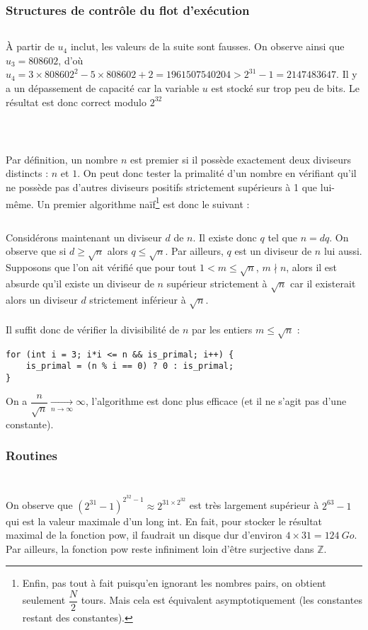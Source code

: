 \documentclass[../main.tex]{subfiles}
\begin{document}
\subsubsection{Structures de contrôle du flot d'exécution}
\solution{[COURS]}
\inputminted{c}{solutions/cours_structure_controle.c}
À partir de $u_{4}$ inclut, les valeurs de la suite sont fausses. On observe ainsi que $u_{3} = 808602$, d'où $u_{4} = 3\times808602^{2} - 5\times{808602} + 2 = 1961507540204 > 2^{31} - 1 = 2147483647$. Il y a un dépassement de capacité car la variable $u$ est stocké sur trop peu de bits. Le résultat est donc correct modulo $2^{32}$
\\ \\ 
\inputminted{c}{solutions/question_d_age.c}
\inputminted{c}{solutions/suite_fibonacci_1.c}
\newline
Par définition, un nombre $n$ est premier si il possède exactement deux diviseurs distincts : $n$ et $1$. On peut donc tester la primalité d'un nombre en vérifiant qu'il ne possède pas d'autres diviseurs positifs strictement supérieurs à 1 que lui-même. Un premier algorithme naïf\footnote{Enfin, pas tout à fait puisqu'en ignorant les nombres pairs, on obtient seulement $\dfrac{N}{2}$ tours. Mais cela est équivalent asymptotiquement (les constantes restant des constantes).} est donc le suivant :
\inputminted{c}{solutions/nombres_premiers.c}
Considérons maintenant un diviseur $d$ de $n$. Il existe donc $q$ tel que $n = dq$. On observe que si $d \geq \sqrt{n}$ alors $q \leq{\sqrt{n}}$. Par ailleurs, $q$ est un diviseur de $n$ lui aussi. Supposons que l'on ait vérifié que pour tout $1 < m \leq \sqrt{n}$, $m\nmid{n}$, alors il est absurde qu'il existe un diviseur de $n$ supérieur strictement à $\sqrt{n}$ car il existerait alors un diviseur $d$ strictement inférieur à $\sqrt{n}$.
\\ \\ 
Il suffit donc de vérifier la divisibilité de $n$ par les entiers $m\leq{\sqrt{n}}$ :
\begin{verbatim}
for (int i = 3; i*i <= n && is_primal; i++) {
	is_primal = (n % i == 0) ? 0 : is_primal;
}
\end{verbatim}
On a $\dfrac{n}{\sqrt{n}}\underset{n\rightarrow{\infty}}{\rightarrow}\infty$, l'algorithme est donc plus efficace (et il ne s'agit pas d'une constante).
\subsubsection{Routines}
\inputminted{c}{solutions/suite_fibonacci_2.c}
\inputminted{c}{solutions/int_pow.c}
On observe que $(2^{31}-1)^{2^{32}-1}\approx{2^{31\times{2^{32}}}}$ est très largement supérieur à $2^{63} - 1$ qui est la valeur maximale d'un \textsf{long int}. En fait, pour stocker le résultat maximal de la fonction \textsf{pow}, il faudrait un disque dur d'environ $4\times{31} = 124\ Go$. Par ailleurs, la fonction \textsf{pow} reste infiniment loin d'être surjective dans $\mathbb{Z}$.
\end{document}
